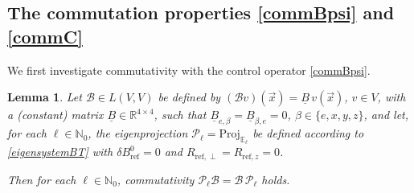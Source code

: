 \documentclass[12pt]{article}
\newtheorem{lemma}[theorem]{Lemma}
\newcommand\BB{\mathcal{B}}
\newcommand\Proj{\mathcal{P}}
\newcommand\vecr{\vec{x}}
\newcommand\ulB{\underline{B}}
\begin{document}
\medskip

\subsection{The commutation properties \eqref{commBpsi} and \eqref{commC}}
\label{subsec:comm_BT}
We first investigate commutativity with the control operator \eqref{commBpsi}.
\begin{lemma}\label{lem:comm_BT}
Let $\BB\in L(V,V)$ be defined by $(\BB v)(\vecr)=\ulB\, v(\vecr)$, $v\in V$, with a (constant) matrix $\ulB\in\mathbb{R}^{4\times4}$, such that $\ulB_{e,\beta}=\ulB_{\beta,e}=0$, $\beta\in\{e,x,y,z\}$, and let, for each $\ell\in\mathbb{N}_0$, the eigenprojection $\Proj_\ell=\text{Proj}_{\mathbb{E}_\ell}$ be defined according to \eqref{eigensystemBT} with $\delta B^0_{\text{ref}}=0$ and $R_{\text{ref},\perp}=R_{\text{ref},z}=0$.

Then for each $\ell\in\mathbb{N}_0$, commutativity
$\Proj_\ell\BB=\BB\,\Proj_\ell$
holds.
\end{lemma}
\end{document}
